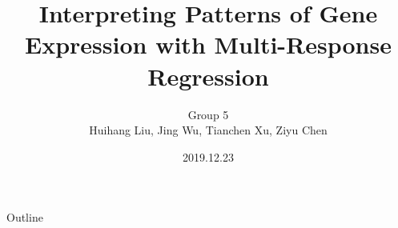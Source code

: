 \title[SOM]{Interpreting Patterns of Gene Expression with Multi-Response Regression}
\author[Group 5]{{\scriptsize Group 5} \\ Huihang Liu, Jing Wu, Tianchen Xu, Ziyu Chen}
\date{2019.12.23}
\maketitle

\begin{frame}{Outline}
    \tableofcontents
\end{frame}


    
    
    






    
